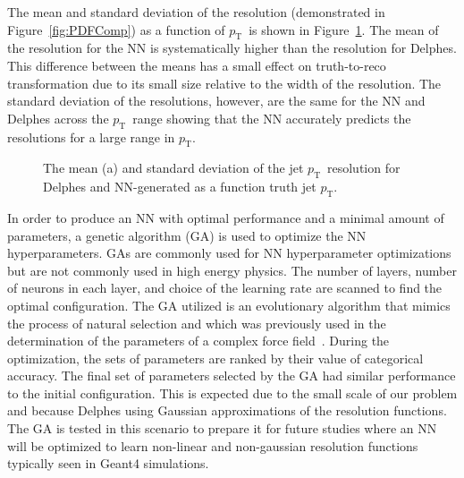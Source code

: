 \documentclass[showpacs,showkeys,preprint,prd,nofootinbib,linenumbers,12pt,superscriptaddress]{revtex4-1}
\def\pt{\ensuremath{p_{\mathrm{T}}}}
\begin{document}
The mean and standard deviation of the resolution (demonstrated in Figure~\ref{fig:PDFComp}) as a function of \pt\ is shown in Figure~\ref{fig:resVsPt}. The mean of the resolution for the NN is systematically higher than the resolution for Delphes. This difference between the means has a small effect on truth-to-reco transformation due to its small size relative to the width of the resolution. The standard deviation of the resolutions, however, are the same for the NN and Delphes across the \pt\ range showing that the NN accurately predicts the resolutions for a large range in \pt. 

\begin{figure}[htb]
  \caption{The mean (a) and standard deviation of the jet \pt\ resolution for Delphes and NN-generated as a function truth jet \pt.}
  \label{fig:resVsPt}
\end{figure}
In order to produce an NN with optimal performance and a minimal amount of parameters, a genetic algorithm (GA) is used to optimize the NN hyperparameters. GAs are commonly used for NN hyperparameter optimizations~\cite{NIPS2011_4443} but are not commonly used in high energy physics. The number of layers, number of neurons in each layer, and choice of the learning rate are scanned to find the optimal configuration. The GA utilized is an evolutionary algorithm that mimics the process of natural selection and which was previously used in the determination of the parameters of a complex force field~\cite{doi:10.1021/acs.jctc.7b00521,doi:10.1021/acs.jctc.6b00432}. During the optimization, the sets of parameters are ranked by their value of categorical accuracy. The final set of parameters selected by the GA had similar performance to the initial configuration. This is expected due to the small scale of our problem and because Delphes using Gaussian approximations of the resolution functions. The GA is tested in this scenario to prepare it for future studies where an NN will be optimized to learn non-linear and non-gaussian resolution functions typically seen in Geant4 simulations. 
\end{document}
